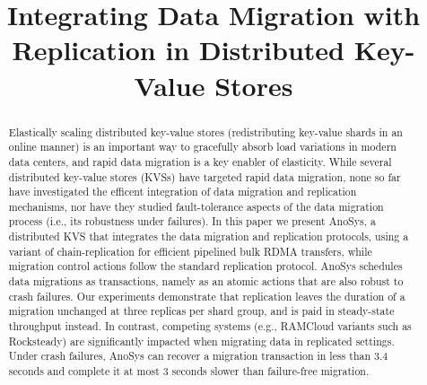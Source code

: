 \documentclass[conference,letterpaper,10pt]{IEEEtran}
\begin{document}
\newcommand{\OurImplementation}{AnoSys}

\title{Integrating Data Migration with Replication in Distributed Key-Value Stores}

\author{}

\maketitle

\begin{abstract}
Elastically scaling distributed key-value stores (redistributing key-value shards in an online manner) is an important way to gracefully absorb load variations in modern data centers, and rapid data migration is a key enabler of elasticity.
While several distributed key-value stores (KVSs) have targeted rapid data migration, none so far have investigated the efficent integration of data migration and replication mechanisms, nor have they studied fault-tolerance aspects of the data migration process (i.e., its robustness under failures).
In this paper we present \OurImplementation{}, 
a distributed KVS that integrates the data migration and replication protocols, using a variant of chain-replication for efficient pipelined bulk RDMA transfers, while migration control actions follow the standard replication protocol.
\OurImplementation{} schedules data migrations as transactions, namely as an atomic actions that are also robust to crash failures.
Our experiments demonstrate that replication leaves the duration of a migration unchanged at three replicas per shard group, and is paid in steady-state throughput instead.
In contrast, competing systems (e.g., RAMCloud variants such as Rocksteady) are significantly impacted when migrating data in replicated settings.
Under crash failures, \OurImplementation{} can recover a migration transaction in less than 3.4 seconds and complete it at most 3 seconds slower than failure-free migration.
\end{abstract}







\clearpage



\end{document}
